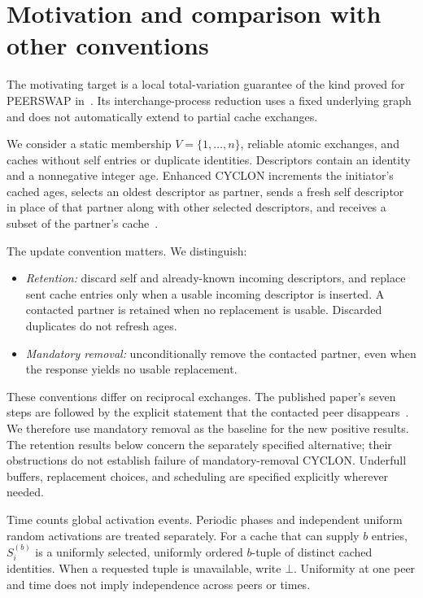 \documentclass[11pt]{article}
\begin{document}
\section{Motivation and comparison with other conventions}

The motivating target is a local total-variation guarantee of the
kind proved for PEERSWAP in~\cite{peerswap}. Its interchange-process
reduction uses a fixed underlying graph and does not automatically
extend to partial cache exchanges.

We consider a static membership $V=\{1,\ldots,n\}$, reliable atomic
exchanges, and caches without self entries or duplicate identities.
Descriptors contain an identity and a nonnegative integer age.
Enhanced CYCLON increments the initiator's cached ages, selects an
oldest descriptor as partner, sends a fresh self descriptor in place
of that partner along with other selected descriptors, and receives
a subset of the partner's cache~\cite{cyclon}.

The update convention matters. We distinguish:
\begin{itemize}
\item \emph{Retention:} discard self and already-known incoming
descriptors, and replace sent cache entries only when a usable incoming
descriptor is inserted. A contacted partner is retained when no
replacement is usable. Discarded duplicates do not refresh ages.
\item \emph{Mandatory removal:} unconditionally remove the contacted
partner, even when the response yields no usable replacement.
\end{itemize}
These conventions differ on reciprocal exchanges. The published
paper's seven steps are followed by the explicit statement that the
contacted peer disappears~\cite[Section 2.2]{cyclon}. We therefore use
mandatory removal as the baseline for the new positive results. The
retention results below concern the separately specified alternative;
their obstructions do not establish failure of mandatory-removal
CYCLON. Underfull buffers, replacement choices, and scheduling are
specified explicitly wherever needed.

Time counts global activation events. Periodic phases and independent
uniform random activations are treated separately. For a cache that
can supply $b$ entries, $S_i^{(b)}$ is a uniformly selected, uniformly
ordered $b$-tuple of distinct cached identities. When a requested
tuple is unavailable, write $\bot$. Uniformity at one peer and time
does not imply independence across peers or times.
\end{document}
